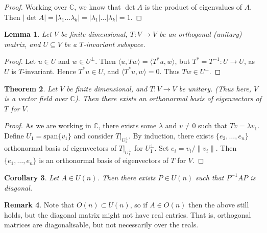 \documentclass[10pt,fleqn]{article}
\newcommand{\spa}{\mathrm{span}}
\newcommand{\comps}{\mathbb{C}}
\theoremstyle{definition} \newtheorem{defn}{Definition}[section]
\theoremstyle{plain}      \newtheorem{thm}[defn]{Theorem}
\theoremstyle{plain}      \newtheorem{prop}[defn]{Proposition}
\theoremstyle{plain}      \newtheorem{lem}[defn]{Lemma}
\theoremstyle{plain}      \newtheorem{cor}[defn]{Corollary}
\theoremstyle{plain}      \newtheorem{ad}[defn]{Addendum}
\theoremstyle{definition} \newtheorem{ex}[defn]{Example}
\theoremstyle{definition} \newtheorem{rem}[defn]{Remark}
\numberwithin{equation}{subsection}
\begin{document}
\begin{proof}
    Working over $\comps$, we know that $\det A$ is the product of eigenvalues of $A$.
    Then $|\det A|=|\lambda_1\ldots\lambda_k|=|\lambda_1|\ldots|\lambda_k|=1$.
\end{proof}

\begin{lem}
    Let $V$ be finite dimensional, $T:V\to V$ be an orthogonal (unitary) matrix, and $U\subseteq V$ be a $T$-invariant subspace.
\end{lem}

\begin{proof}
    Let $u\in U$ and $w\in U^{\perp}$.
    Then $\langle u,Tw\rangle=\langle T^*u,w\rangle$, but $T^*=T^{-1}:U\to U$, as $U$ is $T$-invariant.
    Hence $T^*u\in U$, and $\langle T^*u,w\rangle=0$.
    Thus $Tw\in U^{\perp}$.
\end{proof}

\begin{thm}
Let $V$ be finite dimensional, and $T:V\to V$ be unitary.
(Thus here, $V$ is a vector field over $\comps$).
Then there exists an orthonormal basis of eigenvectors of $T$ for $V$.
\end{thm}

\begin{proof}
    As we are working in $\comps$, there exists some $\lambda$ and $v\neq0$ such that $Tv=\lambda v_1$.
    Define $U_1=\spa\{v_1\}$ and consider $T|_{U_1^{\perp}}$.
    By induction, there exists $\{e_2,\ldots,e_n\}$ orthonormal basis of eigenvectors of $T|_{U_1^{\perp}}$ for $U_1^{\perp}$.
    Set $e_i=v_i/\|v_i\|$.
    Then $\{e_1,\ldots,e_n\}$ is an orthonormal basis of eigenvectors of $T$ for $V$.
\end{proof}

\begin{cor}
    Let $A\in U(n)$.
    Then there exists $P\in U(n)$ such that $P^{-1}AP$ is diagonal.
\end{cor}

\begin{rem}
    Note that $O(n)\subset U(n)$, so if $A\in O(n)$ then the above still holds, but the diagonal matrix might not have real entries.
    That is, orthogonal matrices are diagonalisable, but not necessarily over the reals.
\end{rem}
\end{document}
